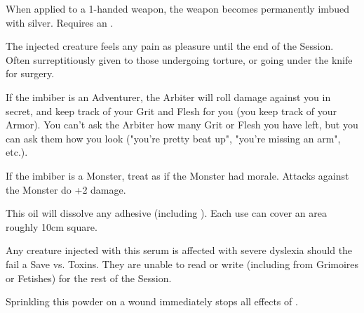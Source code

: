   \CHYMISTRY[
    Name=Tesla's Silver Wash,
    Link=chymistry-teslas-silver-wash,
    Type=Unguent,
    Pips=5,
    Time=Weeks
  ]

  When applied to a 1-handed weapon, the weapon becomes permanently imbued with silver. Requires an .


  \CHYMISTRY[
    Name=Wallace's Anesthetic,
    Link=chymistry-davys-soothing-anesthetic,
    Type=Sera,
    Pips=5,
    Time=Days
  ]

  The injected creature feels any pain as pleasure until the end of the Session. Often surreptitiously given to those undergoing torture, or going under the knife for surgery. 

If the imbiber is an Adventurer, the Arbiter will roll damage against you in secret, and keep track of your Grit and Flesh for you (you keep track of your Armor). You can't ask the Arbiter how many Grit or Flesh you have left, but you can ask them how you look ("you're pretty beat up", "you're missing an arm", etc.).

If the imbiber is a Monster, treat as if the Monster had  morale. Attacks against the Monster do +2 damage.


  \CHYMISTRY[
    Name=Wei Boyang's Alkahest,
    Link=chymistry-wei-boyangs-alkahest,
    Type=Unguent,
    Pips=5,
    Time=Weeks
  ]

  This oil will dissolve any adhesive (including ).  Each use can cover an area roughly 10cm square.


  \CHYMISTRY[
    Name=Wordwarp,
    Link=chymistry-wordwarp,
    Type=Sera,
    Pips=5,
    Time=Weeks
  ]

  Any creature injected with this serum is affected with severe dyslexia should the fail a Save vs. Toxins. They are unable to read or write (including from Grimoires or Fetishes) for the rest of the Session.


  \CHYMISTRY[
    Name=Woundseal,
    Link=chymistry-woundseal,
    Type=Powder,
    Pips=2,
    Time=Days
  ]


  Sprinkling this powder on a wound immediately stops all effects of .





